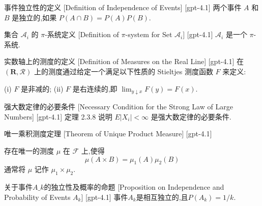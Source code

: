 \documentclass[UTF8]{ctexart}
\begin{document}
    
    
    \begin{dfn}
        {事件独立性的定义}
        [Definition of Independence of Events]
        [gpt-4.1]
        两个事件 $A$ 和 $B$ 是独立的,如果 $P(A \cap B) = P(A) P(B)$.
    \end{dfn}
    
    
    
    \begin{dfn}
        {集合 $\mathcal{A}_i$ 的 $\pi$-系统定义}
        [Definition of $\pi$-system for Set $\mathcal{A}_i$]
        [gpt-4.1]
        $\mathcal{A}_i$ 是一个 $\pi$-系统.
    \end{dfn}
    
    
    
    \begin{dfn}
        {实数轴上的测度的定义}
        [Definition of Measures on the Real Line]
        [gpt-4.1]
        在 $(\mathbf{R}, \mathcal{R})$ 上的测度通过给定一个满足以下性质的 Stieltjes 测度函数 $F$ 来定义:

(i) $F$ 是非减的;
(ii) $F$ 是右连续的,即 $\lim_{y \downarrow x} F(y) = F(x)$.
    \end{dfn}
    
    
    
    \begin{thm}
        {强大数定律的必要条件}
        [Necessary Condition for the Strong Law of Large Numbers]
        [gpt-4.1]
        定理 2.3.8 说明 $E | X_i | < \infty$ 是强大数定律的必要条件.
    \end{thm}
    
    
    
    \begin{thm}
        {唯一乘积测度定理}
        [Theorem of Unique Product Measure]
        [gpt-4.1]
        
存在唯一的测度 $\mu$ 在 $\mathcal{F}$ 上,使得
\[
\mu(A \times B) = \mu_{1}(A) \mu_{2}(B)
\]
通常将 $\mu$ 记作 $\mu_{1} \times \mu_{2}$.

    \end{thm}
    
    
    
    \begin{thm}
        {关于事件$A\_k$的独立性及概率的命题}
        [Proposition on Independence and Probability of Events $A_k$]
        [gpt-4.1]
        事件$A_k$是相互独立的,且$P(A_k) = 1 / k$.
    \end{thm}
    
\end{document}
